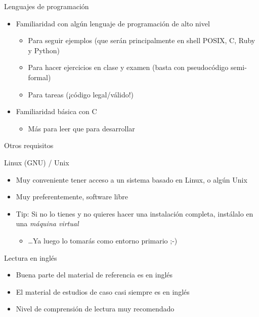 \documentclass[presentation]{beamer}
\begin{document}
\begin{frame}[label={sec:orgf8deb96}]{Lenguajes de programación}
\begin{itemize}
\item Familiaridad con algún lenguaje de programación de alto nivel
\begin{itemize}
\item Para seguir ejemplos (que serán principalmente en shell POSIX,
C, Ruby y Python)
\item Para hacer ejercicios en clase y examen (basta con pseudocódigo
semi-formal)
\item Para tareas (¡código legal/válido!)
\end{itemize}
\item Familiaridad básica con C
\begin{itemize}
\item Más para leer que para desarrollar
\end{itemize}
\end{itemize}
\end{frame}

\begin{frame}[label={sec:org045877a}]{Otros requisitos}
\begin{center}
Linux (GNU) / Unix
\end{center}
\begin{itemize}
\item \alert{Muy} conveniente tener acceso a un sistema basado en Linux, o algún
Unix
\item \alert{Muy} preferentemente, software libre
\item Tip: Si no lo tienes y no quieres hacer una instalación completa,
instálalo en una \emph{máquina virtual}
\begin{itemize}
\item \ldots{}Ya luego lo tomarás como entorno primario ;-)
\end{itemize}
\end{itemize}

\begin{center}
Lectura en inglés
\end{center}
\begin{itemize}
\item Buena parte del material de referencia es en inglés
\item El material de estudios de caso casi siempre es en inglés
\item Nivel de comprensión de lectura \alert{muy} recomendado
\end{itemize}
\end{frame}
\end{document}
